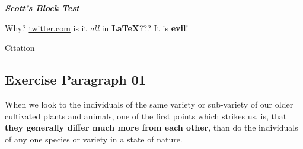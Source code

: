 \textit{\textbf{Scott's Block Test}} 

Why? \href{Why}{twitter.com} is it \textit{all} in \textbf{LaTeX}??? It is \textbf{evil}!

Citation\cite{Ferry_2006}

\subsection{Exercise Paragraph 01}

When we look to the individuals of the same variety or sub-variety of our older cultivated plants and animals, one of the first points which strikes us, is, that \textbf{they generally differ much more from each other}, than do the individuals of any one species or variety in a state of nature.